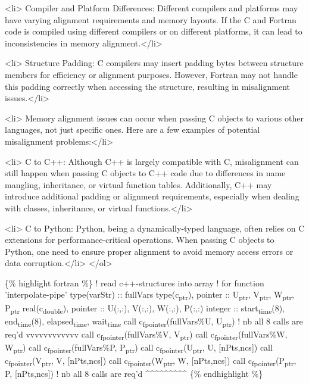 \documentclass[11pt]{article}
\begin{document}
<li> Compiler and Platform Differences: Different compilers and platforms may have varying alignment requirements and memory layouts. If the C and Fortran code is compiled using different compilers or on different platforms, it can lead to inconsistencies in memory alignment.</li>

<li> Structure Padding: C compilers may insert padding bytes between structure members for efficiency or alignment purposes. However, Fortran may not handle this padding correctly when accessing the structure, resulting in misalignment issues.</li>

<li> Memory alignment issues can occur when passing C objects to various other languages, not just specific ones. Here are a few examples of potential misalignment problems:</li>

<li> C to C++: Although C++ is largely compatible with C, misalignment can still happen when passing C objects to C++ code due to differences in name mangling, inheritance, or virtual function tables. Additionally, C++ may introduce additional padding or alignment requirements, especially when dealing with classes, inheritance, or virtual functions.</li>

<li> C to Python: Python, being a dynamically-typed language, often relies on C extensions for performance-critical operations. When passing C objects to Python, one need to ensure proper alignment to avoid memory access errors or data corruption.</li>
</ol>

\{\% highlight fortran \%\}
! read c++-structures into array
! for function 'interpolate-pipe'
type(varStr) :: fullVars
type(c\textsubscript{ptr}), pointer :: U\textsubscript{ptr}, V\textsubscript{ptr}, W\textsubscript{ptr}, P\textsubscript{ptr}
real(c\textsubscript{double}), pointer :: U(:,:), V(:,:), W(:,:), P(:,:)
integer :: start\textsubscript{time}(8), end\textsubscript{time}(8), elapsed\textsubscript{time}, wait\textsubscript{time}
call c\textsubscript{f}\textsubscript{pointer}(fullVars\%U, U\textsubscript{ptr}) ! nb all 8 calls are req'd vvvvvvvvvvvv
call c\textsubscript{f}\textsubscript{pointer}(fullVars\%V, V\textsubscript{ptr})
call c\textsubscript{f}\textsubscript{pointer}(fullVars\%W, W\textsubscript{ptr})
call c\textsubscript{f}\textsubscript{pointer}(fullVars\%P, P\textsubscript{ptr})
call c\textsubscript{f}\textsubscript{pointer}(U\textsubscript{ptr}, U, [nPts,ncs])
call c\textsubscript{f}\textsubscript{pointer}(V\textsubscript{ptr}, V, [nPts,ncs])
call c\textsubscript{f}\textsubscript{pointer}(W\textsubscript{ptr}, W, [nPts,ncs])
call c\textsubscript{f}\textsubscript{pointer}(P\textsubscript{ptr}, P, [nPts,ncs]) ! nb all 8 calls are req'd \^{}\^{}\^{}\^{}\^{}\^{}\^{}\^{}\^{}
\{\% endhighlight \%\}
\end{document}
